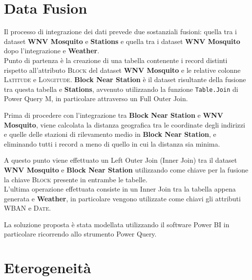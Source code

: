 \section{Data Fusion}
Il processo di integrazione dei dati prevede due sostanziali fusioni: quella tra i dataset \textbf{WNV Mosquito} e \textbf{Stations} e quella tra i dataset \textbf{WNV Mosquito} dopo l'integrazione e \textbf{Weather}.\\ 

Punto di partenza è la creazione di una tabella contenente i record distinti rispetto all'attributo \textsc{Block} del dataset \textbf{WNV Mosquito} e le relative colonne \textsc{Latitude} e \textsc{Longitude}. 
\textbf{Block Near Station} è il dataset risultante della fusione tra questa tabella e \textbf{Stations}, avvenuto utilizzando la funzione \texttt{Table.Join} di Power Query M, in particolare attraverso un Full Outer Join. 

Prima di procedere con l'integrazione tra \textbf{Block Near Station} e \textbf{WNV Mosquito}, viene calcolata la distanza geografica tra le coordinate degli indirizzi e quelle delle stazioni di rilevamento medio in \textbf{Block Near Station}, e eliminando tutti i record a meno di quello in cui la distanza sia minima.

A questo punto viene effettuato un Left Outer Join (Inner Join) tra il dataset \textbf{WNV Mosquito} e \textbf{Block Near Station} utilizzando come chiave per la fusione la chiave \textsc{Block} presente in entrambe le tabelle.\\


L'ultima operazione effettuata consiste in un Inner Join tra la tabella appena generata e \textbf{Weather}, in particolare vengono utilizzate come chiavi gli attributi \textsc{WBAN} e \textsc{Date}.

La soluzione proposta è stata modellata utilizzando il software Power BI in particolare ricorrendo allo strumento Power Query.

\section{Eterogeneità}